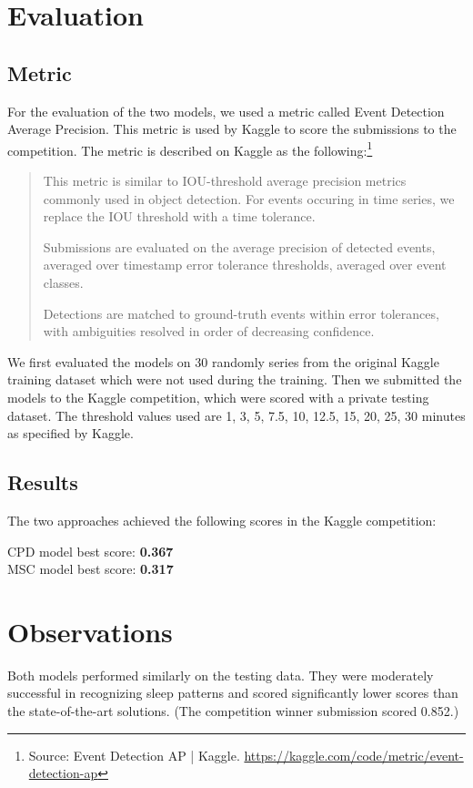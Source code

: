 \documentclass{article}
\begin{document}
\section{Evaluation}

\subsection{Metric}
For the evaluation of the two models, we used a metric called Event Detection Average Precision. This metric is used by Kaggle to score the submissions to the competition. The metric is described on Kaggle as the following:\footnote{Source: Event Detection AP | Kaggle. \url{https://kaggle.com/code/metric/event-detection-ap}}
\begin{quote}
    This metric is similar to IOU-threshold average precision metrics commonly
    used in object detection. For events occuring in time series, we replace the
    IOU threshold with a time tolerance.

    Submissions are evaluated on the average precision of detected events,
    averaged over timestamp error tolerance thresholds, averaged over event
    classes.

    Detections are matched to ground-truth events within error tolerances, with
    ambiguities resolved in order of decreasing confidence.
\end{quote}

We first evaluated the models on 30 randomly series from the original Kaggle training dataset which were not used during the training. Then we submitted the models to the Kaggle competition, which were scored with a private testing dataset. The threshold values used are 1, 3, 5, 7.5, 10, 12.5, 15, 20, 25, 30 minutes as specified by Kaggle.

\subsection{Results}
The two approaches achieved the following scores in the Kaggle competition:

CPD model best score: \textbf{0.367}\\
MSC model best score: \textbf{0.317}

\section{Observations}

Both models performed similarly on the testing data. They were moderately successful in recognizing sleep patterns and scored significantly lower scores than the state-of-the-art solutions. (The competition winner submission scored 0.852.)
\end{document}
